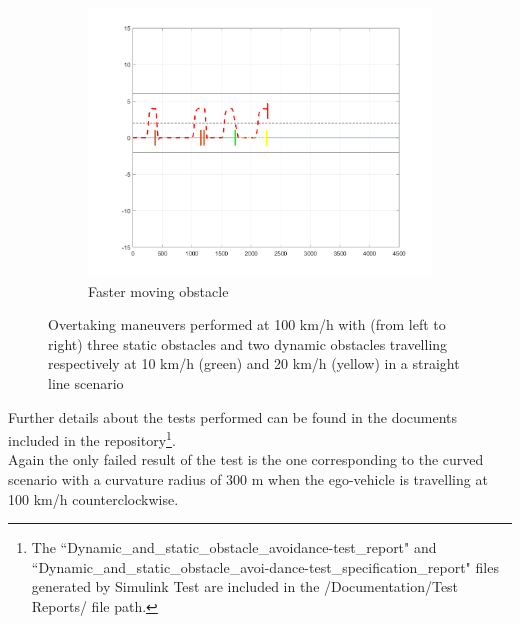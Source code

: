 \begin{figure}[H]
\begin{subfigure}{.33\textwidth}
    \end{subfigure}
    \begin{subfigure}{.33\textwidth}
    \centering
    \includegraphics[width=1.1\textwidth,keepaspectratio]{Figures/overtake_multiple_right.png}
    \caption{Faster moving obstacle}
    \label{subfig:multiple_right}
    \end{subfigure}
    \caption{Overtaking maneuvers performed at 100 km/h with (from left to right) three static obstacles and two dynamic obstacles travelling respectively at 10 km/h (green) and 20 km/h (yellow) in a straight line scenario}
    \label{fig:static_and_dynamic_obstacle_avoidance}
\end{figure}

Further details about the tests performed can be found in the documents included in the repository\footnote{The ``Dynamic\_and\_static\_obstacle\_avoidance-test\_report" and ``Dynamic\_and\_static\_obstacle\_avoi-dance-test\_specification\_report" files generated by Simulink Test are included in the /Documentation/Test Reports/ file path.}.\\
Again the only failed result of the test is the one corresponding to the curved scenario with a curvature radius of 300 m when the ego-vehicle is travelling at 100 km/h counterclockwise.







